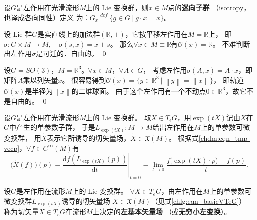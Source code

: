 
\begin{definition}\label{chlg:def_isotropy}
    设$G$是左作用在光滑流形$M$上的 Lie 变换群，则$x \in M$点的\textbf{迷向子群}
    （isotropy，也译成{\kaishu 各向同性}）定义
    为：$G_x \overset{def}{=} \{ g\in G \ | \  g\cdot x = x \}$。
\end{definition}

\begin{example}
    设 Lie 群$G$是实直线上的加法群$(\mathbb{R},+)$，它按平移左作用在$M=\mathbb{R}$上，
    即$\sigma: G\times M \to M,\quad \sigma(s,x)=x+s$。
    那么$\forall x\in M\equiv \mathbb{R}$有$\mathcal{O}(x)=\mathbb{R}$。
    不难判断出左作用$\sigma$是可迁的、自由的。 \qed
\end{example}

\begin{example}
    设$G=SO(3)$，$M=\mathbb{R}^3$。$\forall x\in M$，$\forall A\in G$，
    考虑左作用$\sigma(A,x)=A\cdot x$，即矩阵$A$乘以列矢量$x$。
    很容易得到$\mathcal{O}(x)=\{y\in \mathbb{R}^3 \ |\   \left\|y\right\|=\left\|x\right\| \}$，
    即轨道$\mathcal{O}(x)$是半径为$\left\|x\right\|$的二维球面。
    由于这个左作用有一个不动点$0\in \mathbb{R}^3$，故它不是自由的。 \qed
\end{example}



设$G$是左作用在光滑流形$M$上的 Lie 变换群。
取$X \in T_e G$，用$\exp(tX)$记由$X$在$G$中产生的单参数子群，
于是$L_{\exp(tX)}: M \rightarrow M$给出左作用在$M$上的单参数可微变换群，
用$\widetilde{X}$表示它所诱导的切矢量场，$\widetilde{X} \in \mathfrak{X}(M)$。
根据式\eqref{chdm:eqn_tmp-vecp}，$\forall f \in C^{\infty}(M)$有
\begin{equation}\label{chlg:eqn_basicVTeG}
    \bigl(\widetilde{X}(f)\bigr)(p) = \left.\frac{\mathrm{d} f\left(L_{\exp(tX)}(p)\right)}{\mathrm{d} t}\right|_{t=0} 
    =\lim _{t \rightarrow 0} \frac{f\bigl(\exp(tX)\cdot p\bigr)-f(p)}{t} .
\end{equation}


\begin{definition}\label{chlg:def_left-basicV}
    设$G$是左作用在流形$M$上的 Lie 变换群。
    $\forall X \in T_e G$，由左作用在$M$上的单参数可微变换群$L_{\exp (t  X)}$诱导的切矢量场
    $\widetilde{X} \in \mathfrak{X}(M)$（见式\eqref{chlg:eqn_basicVTeG}）
    称为切矢量$X \in T_e G$在流形$M$上决定的\textbf{左基本矢量场}
    （或\textbf{无穷小左变换}）。
\end{definition} 



